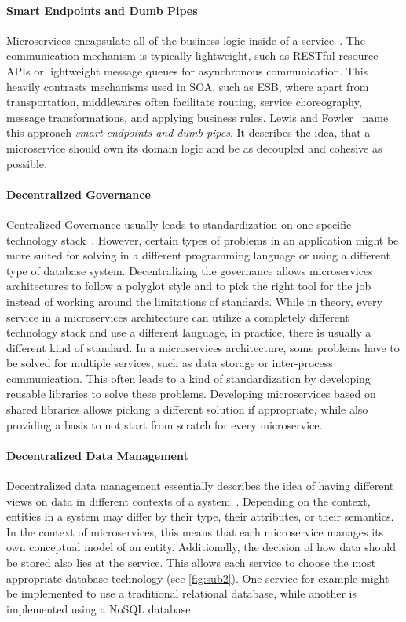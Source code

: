 \paragraph{Smart Endpoints and Dumb Pipes}

Microservices encapsulate all of the business logic inside of a service~\cite{Lewis2014}.
The communication mechanism is typically lightweight, such as \ac{REST}ful resource \acp{API} or lightweight message queues for asynchronous communication.
This heavily contrasts mechanisms used in \ac{SOA}, such as \ac{ESB}, where apart from transportation, middlewares often facilitate routing, service choreography, message transformations, and applying business rules.
Lewis and Fowler~\cite{Lewis2014} name this approach \textit{smart endpoints and dumb pipes}.
It describes the idea, that a microservice should own its domain logic and be as decoupled and cohesive as possible.

\paragraph{Decentralized Governance}

Centralized Governance usually leads to standardization on one specific technology stack~\cite{Lewis2014}.
However, certain types of problems in an application might be more suited for solving in a different programming language or using a different type of database system.
Decentralizing the governance allows microservices architectures to follow a polyglot style and to pick the right tool for the job instead of working around the limitations of standards.
While in theory, every service in a microservices architecture can utilize a completely different technology stack and use a different language, in practice, there is usually a different kind of standard.
In a microservices architecture, some problems have to be solved for multiple services, such as data storage or inter-process communication.
This often leads to a kind of standardization by developing reusable libraries to solve these problems.
Developing microservices based on shared libraries allows picking a different solution if appropriate, while also providing a basis to not start from scratch for every microservice.


\paragraph{Decentralized Data Management}

Decentralized data management essentially describes the idea of having different views on data in different contexts of a system~\cite{Lewis2014, Balalaie2016, Taibi2020}.
Depending on the context, entities in a system may differ by their type, their attributes, or their semantics.
In the context of microservices, this means that each microservice manages its own conceptual model of an entity.
Additionally, the decision of how data should be stored also lies at the service.
This allows each service to choose the most appropriate database technology (see \autoref{fig:sub2}).
One service for example might be implemented to use a traditional relational database, while another is implemented using a NoSQL database.

